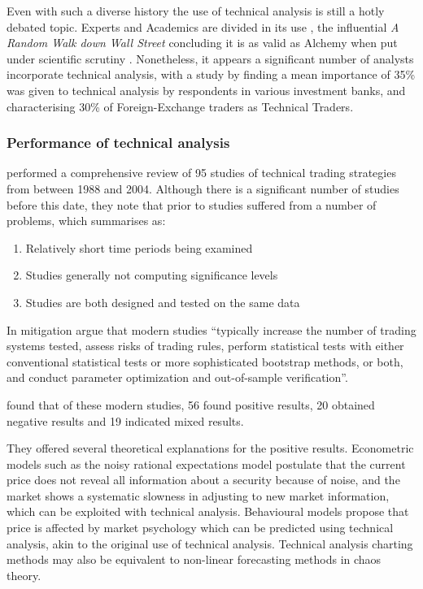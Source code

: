 \documentclass[12pt]{article}
\theoremstyle{definition}
\begin{document}
Even with such a diverse history the use of technical analysis is still a hotly debated topic. Experts and Academics are divided in its use \citep{foundations}, the influential \textit{A Random Walk down Wall Street} concluding it is as valid as Alchemy when put under scientific scrutiny \cite[p.159]{randomwalk2012}. Nonetheless, it appears a significant number of analysts incorporate technical analysis, with a study by \cite{examininguse1997} finding a mean importance of 35\% was given to technical analysis by respondents in various investment banks, and \cite{cheung2000currency} characterising 30\% of Foreign-Exchange traders as Technical Traders. 

\subsubsection{Performance of technical analysis}
\label{taperformance}
\cite{taprofitability} performed a comprehensive review of 95 studies of technical trading strategies from between 1988 and 2004. Although there is a significant number of studies before this date, they note that prior to \cite{lukac1988} studies suffered from a number of problems, which \cite{brock1992} summarises as:

\begin{enumerate}[label=\roman*]
\item Relatively short time periods being examined 
\item Studies generally not computing significance levels 
\item Studies are both designed and tested on the same data
\end{enumerate}

In mitigation \cite{taprofitability} argue that modern studies ``typically
increase the number of trading systems tested, assess risks of trading rules,
perform statistical tests with either conventional statistical tests or more sophisticated bootstrap methods, or both, and conduct parameter optimization and out-of-sample verification''.

\cite{taprofitability} found that of these modern studies, 56 found positive results, 20 obtained negative results and 19 indicated mixed results. 

They offered several theoretical explanations for the positive results. Econometric models such as the noisy rational expectations model postulate that the current price does not reveal all information about a security because of noise, and the market shows a systematic slowness in adjusting to new market information, which can be exploited with technical analysis. Behavioural models propose that price is affected by market psychology which can be predicted using technical analysis, akin to the original use of technical analysis. Technical analysis charting methods may also be equivalent to non-linear forecasting methods in chaos theory.
\end{document}

